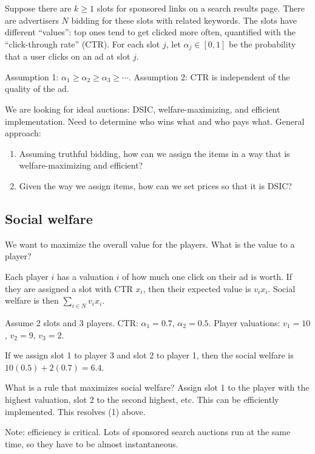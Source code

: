\documentclass[12pt,letterpaper]{report}
\begin{document}
Suppose there are $k \geq 1$ slots for sponsored links on a search results page.
There are advertisers $N$ bidding for these slots with related keywords.
The slots have different ``values'': top ones tend to get clicked more often, quantified with the
``click-through rate'' (CTR).
For each slot $j$, let $\alpha_j \in [0, 1]$ be the probability that a user clicks on an ad at slot
$j$.

Assumption 1: $\alpha_1 \geq \alpha_2 \geq \alpha_3 \geq \cdots$.
Assumption 2: CTR is independent of the quality of the ad.

We are looking for ideal auctions: DSIC, welfare-maximizing, and efficient implementation.
Need to determine who wins what and who pays what.
General approach:
\begin{enumerate}[label=(\arabic*)]
  \item
  Assuming truthful bidding, how can we assign the items in a way that is welfare-maximizing and
  efficient?
  \item
  Given the way we assign items, how can we set prices so that it is DSIC?
\end{enumerate}

\subsection{Social welfare}

We want to maximize the overall value for the players.
What is the value to a player?

Each player $i$ has a valuation $i$ of how much one click on their ad is worth.
If they are assigned a slot with CTR $x_i$, then their expected value is $v_i x_i$.
Social welfare is then $\sum_{i \in N} v_i x_i$.

\begin{ex}
  Assume 2 slots and 3 players.
  CTR: $\alpha_1 = 0.7$, $\alpha_2 = 0.5$.
  Player valuations: $v_1 = 10$, $v_2 = 9$, $v_3 = 2$.

  If we assign slot 1 to player 3 and slot 2 to player 1, then the social welfare is
  $10(0.5) + 2(0.7) = 6.4$.
\end{ex}

What is a rule that maximizes social welfare?
Assign slot 1 to the player with the highest valuation, slot 2 to the second highest, etc.
This can be efficiently implemented.
This resolves (1) above.

Note: efficiency is critical.
Lots of sponsored search auctions run at the same time, so they have to be almost instantaneous.
\end{document}
